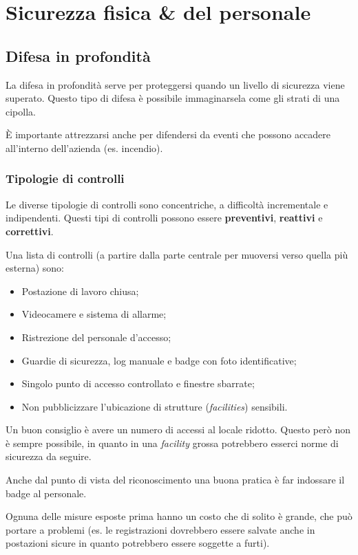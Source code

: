\part{Sicurezza fisica \& del personale}
\label{SFDP}
\chapter{Difesa in profondità}

La difesa in profondità serve per proteggersi quando un livello di sicurezza 
viene superato. Questo tipo di difesa è possibile immaginarsela come gli strati 
di una cipolla.

È importante attrezzarsi anche per difendersi da eventi che possono accadere 
all'interno dell'azienda (es. incendio).

\section{Tipologie di controlli}

Le diverse tipologie di controlli sono concentriche, a difficoltà incrementale e 
indipendenti. Questi tipi di controlli possono essere \textbf{preventivi}, 
\textbf{reattivi} e \textbf{correttivi}.

Una lista di controlli (a partire dalla parte centrale per muoversi 
verso quella più esterna) sono:

\begin{itemize}
\item Postazione di lavoro chiusa;
\item Videocamere e sistema di allarme;
\item Ristrezione del personale d'accesso;
\item Guardie di sicurezza, log manuale e badge con foto identificative;
\item Singolo punto di accesso controllato e finestre sbarrate;
\item Non pubblicizzare l'ubicazione di strutture (\textit{facilities})
sensibili.
\end{itemize}

Un buon consiglio è avere un numero di accessi al locale ridotto. Questo però 
non è sempre possibile, in quanto in una \textit{facility} grossa potrebbero 
esserci norme di sicurezza da seguire.

Anche dal punto di vista del riconoscimento una buona pratica è 
far indossare il badge al personale.

Ognuna delle misure esposte prima hanno un costo che di solito è grande, che 
può portare a problemi (es. le registrazioni dovrebbero essere 
salvate anche in postazioni sicure in quanto potrebbero essere soggette a furti).

